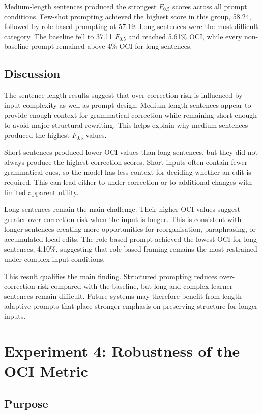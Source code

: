 Medium-length sentences produced the strongest $F_{0.5}$ scores across all prompt conditions. Few-shot prompting achieved the highest score in this group, 58.24, followed by role-based prompting at 57.19. Long sentences were the most difficult category. The baseline fell to 37.11 $F_{0.5}$ and reached 5.61\% OCI, while every non-baseline prompt remained above 4\% OCI for long sentences.

\subsection{Discussion}

The sentence-length results suggest that over-correction risk is influenced by input complexity as well as prompt design. Medium-length sentences appear to provide enough context for grammatical correction while remaining short enough to avoid major structural rewriting. This helps explain why medium sentences produced the highest $F_{0.5}$ values.

Short sentences produced lower OCI values than long sentences, but they did not always produce the highest correction scores. Short inputs often contain fewer grammatical cues, so the model has less context for deciding whether an edit is required. This can lead either to under-correction or to additional changes with limited apparent utility.

Long sentences remain the main challenge. Their higher OCI values suggest greater over-correction risk when the input is longer. This is consistent with longer sentences creating more opportunities for reorganisation, paraphrasing, or accumulated local edits. The role-based prompt achieved the lowest OCI for long sentences, 4.10\%, suggesting that role-based framing remains the most restrained under complex input conditions.

This result qualifies the main finding. Structured prompting reduces over-correction risk compared with the baseline, but long and complex learner sentences remain difficult. Future systems may therefore benefit from length-adaptive prompts that place stronger emphasis on preserving structure for longer inputs.

\section{Experiment 4: Robustness of the OCI Metric}

\subsection{Purpose}

